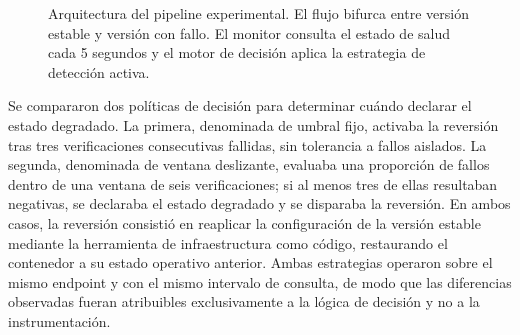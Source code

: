 \documentclass[conference]{IEEEtran}
\begin{document}
\begin{figure}[t]
\centering
{}
\caption{Arquitectura del pipeline experimental. El flujo bifurca entre versi\'on estable y versi\'on con fallo. El monitor consulta el estado de salud cada 5 segundos y el motor de decisi\'on aplica la estrategia de detecci\'on activa.}
\label{fig:arquitectura}
\end{figure}

Se compararon dos pol\'iticas de decisi\'on para determinar cu\'ando declarar el estado degradado. La primera, denominada de umbral fijo, activaba la reversi\'on tras tres verificaciones consecutivas fallidas, sin tolerancia a fallos aislados. La segunda, denominada de ventana deslizante, evaluaba una proporci\'on de fallos dentro de una ventana de seis verificaciones; si al menos tres de ellas resultaban negativas, se declaraba el estado degradado y se disparaba la reversi\'on. En ambos casos, la reversi\'on consisti\'o en reaplicar la configuraci\'on de la versi\'on estable mediante la herramienta de infraestructura como c\'odigo, restaurando el contenedor a su estado operativo anterior. Ambas estrategias operaron sobre el mismo endpoint y con el mismo intervalo de consulta, de modo que las diferencias observadas fueran atribuibles exclusivamente a la l\'ogica de decisi\'on y no a la instrumentaci\'on.
\end{document}
